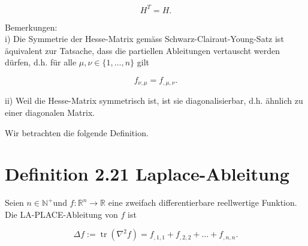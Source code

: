 \documentclass[10pt]{article}
\begin{document}
\begin{equation*}
H^{T}=H . \tag{2.146}
\end{equation*}


Bemerkungen:\\
i) Die Symmetrie der Hesse-Matrix gemäss Schwarz-Clairaut-Young-Satz ist äquivalent zur Tatsache, dass die partiellen Ableitungen vertauscht werden dürfen, d.h. für alle $\mu, \nu \in\{1, \ldots, n\}$ gilt


\begin{equation*}
f_{\nu, \mu}=f_{, \mu, \nu} . \tag{2.147}
\end{equation*}


ii) Weil die Hesse-Matrix symmetrisch ist, ist sie diagonalisierbar, d.h. ähnlich zu einer diagonalen Matrix.

Wir betrachten die folgende Definition.

\section*{Definition 2.21 Laplace-Ableitung}
Seien $n \in \mathbb{N}^{+}$und $f: \mathbb{R}^{n} \rightarrow \mathbb{R}$ eine zweifach differentierbare reellwertige Funktion. Die LA-PLACE-Ableitung von $f$ ist


\begin{equation*}
\Delta f:=\operatorname{tr}\left(\nabla^{2} f\right)=f_{, 1,1}+f_{, 2,2}+\ldots+f_{, n, n} . \tag{2.148}
\end{equation*}
\end{document}
